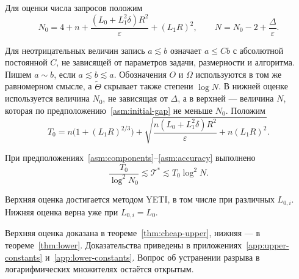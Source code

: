 Для оценки числа запросов положим
\begin{equation}\label{eq:complexity-parameters}
 N_0=4+n+\frac{(L_0+L_1^2\delta)R^2}{\varepsilon}+(L_1R)^2,
 \qquad N=N_0-2+\frac\Delta\varepsilon.
\end{equation}

Для неотрицательных величин запись $a\lesssim b$ означает
$a\le Cb$ с абсолютной постоянной $C$,
не зависящей от параметров задачи, размерности и алгоритма.
Пишем $a\sim b$, если $a\lesssim b\lesssim a$.
Обозначения $O$ и $\Omega$ используются в том же равномерном смысле,
а $\widetilde\Theta$ скрывает также степени $\log N$.
В нижней оценке используется величина $N_0$, не зависящая от $\Delta$,
а в верхней --- величина $N$, которая по предположению~\ref{asm:initial-gap}
не меньше $N_0$.
Положим
\begin{equation}\label{eq:complexity-order}
 T_0=
 n\bigl(1+(L_1R)^{2/3}\bigr)
 +\sqrt{\frac{n(L_0+L_1^2\delta)R^2}{\varepsilon}+n(L_1R)^2}.
\end{equation}

\begin{theorem}\label{thm:main}
При предположениях~\ref{asm:components}--\ref{asm:accuracy} выполнено
\begin{equation}\label{eq:main-bounds}
 \frac{T_0}{\log^2N_0}\lesssim\mathcal T^\ast
 \lesssim T_0\log^2N.
\end{equation}
\end{theorem}

Верхняя оценка достигается методом YETI, в том числе
при различных $L_{0,i}$.
Нижняя оценка верна уже при $L_{0,i}=L_0$.

Верхняя оценка доказана в теореме~\ref{thm:cheap-upper},
нижняя --- в теореме~\ref{thm:lower}. Доказательства приведены
в приложениях~\ref{app:upper-constants} и~\ref{app:lower-constants}.
Вопрос об устранении разрыва в логарифмических множителях остаётся открытым.
